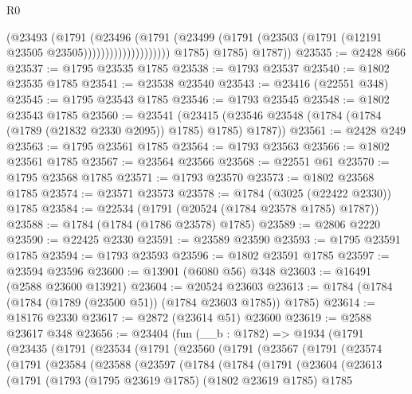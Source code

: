 \begin{lexlean}{R0}
\begin{coremodule}
                                  (@23493
                                    (@1791
                                      (@23496
                                        (@1791
                                          (@23499
                                            (@1791
                                              (@23503
                                                (@1791 (@12191 @23505 @23505))))))))))))))))))))
            @1785)
          @1785)
        @1787))
@23535 := @2428 @66
@23537 := @1795 @23535 @1785
@23538 := @1793 @23537
@23540 := @1802 @23535 @1785
@23541 := @23538 @23540
@23543 := @23416 (@22551 @348)
@23545 := @1795 @23543 @1785
@23546 := @1793 @23545
@23548 := @1802 @23543 @1785
@23560 := @23541
    (@23415 (@23546 @23548 (@1784 (@1784 (@1789 (@21832 @2330 @2095)) @1785) @1785) @1787))
@23561 := @2428 @249
@23563 := @1795 @23561 @1785
@23564 := @1793 @23563
@23566 := @1802 @23561 @1785
@23567 := @23564 @23566
@23568 := @22551 @61
@23570 := @1795 @23568 @1785
@23571 := @1793 @23570
@23573 := @1802 @23568 @1785
@23574 := @23571 @23573
@23578 := @1784 (@3025 (@22422 @2330)) @1785
@23584 := @22534 (@1791 (@20524 (@1784 @23578 @1785) @1787))
@23588 := @1784 (@1784 (@1786 @23578) @1785)
@23589 := @2806 @2220
@23590 := @22425 @2330
@23591 := @23589 @23590
@23593 := @1795 @23591 @1785
@23594 := @1793 @23593
@23596 := @1802 @23591 @1785
@23597 := @23594 @23596
@23600 := @13901 (@6080 @56) @348
@23603 := @16491 (@2588 @23600 @13921)
@23604 := @20524 @23603
@23613 := @1784 (@1784 (@1784 (@1789 (@23500 @51)) (@1784 @23603 @1785)) @1785)
@23614 := @18176 @2330
@23617 := @2872 (@23614 @51) @23600
@23619 := @2588 @23617 @348
@23656 := @23404
    (fun (__b : @1782) =>
    @1934
      (@1791
        (@23435
          (@1791
            (@23534
              (@1791
                (@23560
                  (@1791
                    (@23567
                      (@1791
                        (@23574
                          (@1791
                            (@23584
                              (@23588
                                (@23597
                                  (@1784
                                    (@1784
                                      (@1791
                                        (@23604
                                          (@23613
                                            (@1791
                                              (@1793
                                                (@1795 @23619 @1785)
                                                (@1802 @23619 @1785)
                                                @1785

\end{coremodule}
\end{lexlean}
